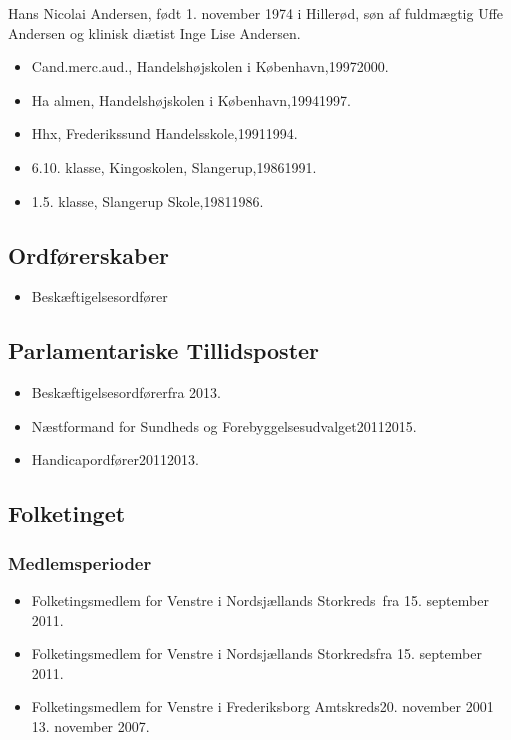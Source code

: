 \documentclass[11pt, a4paper]{awesome-cv}
\begin{document}
\makecvheader[R]
\makelettertitle
\begin{cvletter}
Hans Nicolai Andersen, født 1. november 1974 i Hillerød, søn af fuldmægtig Uffe Andersen og klinisk diætist Inge Lise Andersen.

\begin{itemize}
\item Cand.merc.aud., Handelshøjskolen i København,19972000.
\item Ha almen, Handelshøjskolen i København,19941997.
\item Hhx, Frederikssund Handelsskole,19911994.
\item 6.10. klasse, Kingoskolen, Slangerup,19861991.
\item 1.5. klasse, Slangerup Skole,19811986.
\end{itemize}
\subsection*{Ordførerskaber}
\begin{itemize}
\item Beskæftigelsesordfører
\end{itemize}
\subsection*{Parlamentariske Tillidsposter}
\begin{itemize}
\item Beskæftigelsesordførerfra 2013.
\item Næstformand for Sundheds og Forebyggelsesudvalget20112015.
\item Handicapordfører20112013.
\end{itemize}
\subsection*{Folketinget}
\subsubsection*{Medlemsperioder}
\begin{itemize}
\item Folketingsmedlem for Venstre i Nordsjællands Storkreds fra 15. september 2011.
\item Folketingsmedlem for Venstre i Nordsjællands Storkredsfra 15. september 2011.
\item Folketingsmedlem for Venstre i Frederiksborg Amtskreds20. november 2001  13. november 2007.
\end{itemize}

\end{cvletter}
\end{document}

